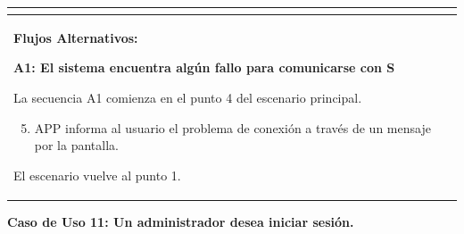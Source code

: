 \begin{longtable}{|l|p{5.5cm}|l|p{2cm}|l|p{1.9cm}|}
{					} \\ \hline

					\multicolumn{6}{|p{15cm}|}{ \textbf{Flujos Alternativos: }
					
					\textbf{A1: El sistema encuentra algún fallo para comunicarse con S}
					
					La secuencia A1 comienza en el punto 4 del escenario principal.
					\begin{enumerate}
							\setcounter{enumi}{4}
							\item APP informa al usuario el problema de conexión a través de un mensaje por la pantalla.
					\end{enumerate}

					El escenario vuelve al punto 1.

					} \\ \hline

			\end{longtable}
		\textbf{Caso de Uso 11: Un administrador desea iniciar sesión.}
